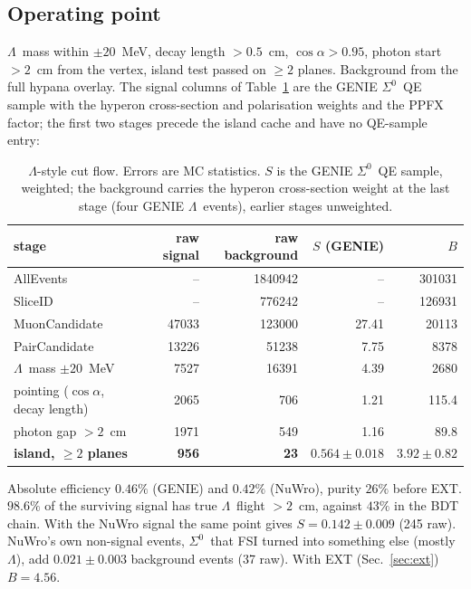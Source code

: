 \documentclass[11pt,a4paper]{article}
\newcommand{\Szero}{\ensuremath{\Sigma^{0}}}
\newcommand{\Lam}{\ensuremath{\Lambda}}
\begin{document}
\subsection{Operating point}

\Lam\ mass within $\pm20$~MeV, decay length $>0.5$~cm, $\cos\alpha>0.95$, photon start
$>2$~cm from the vertex, island test passed on $\geq2$ planes. Background from the full
hypana overlay. The signal columns of Table~\ref{tab:lscutflow} are the GENIE \Szero\ QE
sample with the hyperon cross-section and polarisation weights and the PPFX factor; the
first two stages precede the island cache and have no QE-sample entry:

\begin{table}[h]\centering
\caption{\Lam-style cut flow. Errors are MC statistics. $S$ is the GENIE \Szero\ QE sample,
weighted; the background carries the hyperon cross-section weight at the last stage (four
GENIE \Lam\ events), earlier stages unweighted.}
\label{tab:lscutflow}
\begin{tabular}{lrrrr}
\toprule
stage & raw signal & raw background & $S$ (GENIE) & $B$ \\
\midrule
AllEvents                 &    -- & 1840942 &    -- & 301031 \\
SliceID                   &    -- &  776242 &    -- & 126931 \\
MuonCandidate             & 47033 &  123000 & 27.41 &  20113 \\
PairCandidate             & 13226 &   51238 &  7.75 &   8378 \\
\Lam\ mass $\pm20$~MeV    &  7527 &   16391 &  4.39 &   2680 \\
pointing ($\cos\alpha$, decay length) & 2065 & 706 & 1.21 & 115.4 \\
photon gap $>2$~cm        &  1971 &     549 &  1.16 &   89.8 \\
\textbf{island, $\geq2$ planes} & \textbf{956} & \textbf{23} & $\mathbf{0.564\pm0.018}$ & $\mathbf{3.92\pm0.82}$ \\
\bottomrule
\end{tabular}
\end{table}

\noindent Absolute efficiency $0.46\%$ (GENIE) and $0.42\%$ (NuWro), purity $26\%$
before EXT. $98.6\%$ of the surviving signal has true \Lam\ flight $>2$~cm, against
$43\%$ in the BDT chain. With the NuWro signal the same point gives
$S = 0.142\pm0.009$ (245 raw). NuWro's own non-signal events, \Szero\ that FSI turned
into something else (mostly \Lam), add $0.021\pm0.003$ background events (37 raw).
With EXT (Sec.~\ref{sec:ext}) $B = 4.56$.
\end{document}
